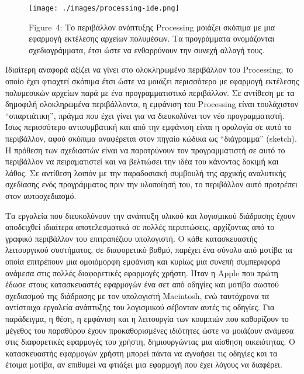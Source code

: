 \documentclass[
]{article}
\begin{document}
\leavevmode{}%
\begin{figure}
\hypertarget{fig:processing-ide}{%
\centering
\texttt{[image: ./images/processing-ide.png]}
\caption{Figure~4: Το περιβάλλον ανάπτυξης Processing μοιάζει σκόπιμα με
μια εφαρμογή εκτέλεσης αρχείων πολυμέσων. Τα προγράμματα ονομάζονται
σχεδιαγράμματα, έτσι ώστε να ενθαρρύνουν την συνεχή αλλαγή
τους.}\label{fig:processing-ide}
}
\end{figure}

Ιδιαίτερη αναφορά αξίζει να γίνει στο ολοκληρωμένο περιβάλλον του
Processing, το οποίο έχει φτιαχτεί σκόπιμα έτσι ώστε να μοιάζει
περισσότερο με εφαρμογή εκτέλεσης πολυμεσικών αρχείων παρά με ένα
προγραμματιστικό περιβάλλον. Σε αντίθεση με τα δημοφιλή ολοκληρωμένα
περιβάλλοντα, η εμφάνιση του Processing είναι τουλάχιστον
``σπαρτιάτικη'', πράγμα που έχει γίνει για να διευκολύνει τον νέο
προγραμματιστή. Ίσως περισσότερο αντισυμβατική και από την εμφάνιση
είναι η ορολογία σε αυτό το περιβάλλον, αφού σκόπιμα αναφέρεται στον
πηγαίο κώδικα ως ``διάγραμμα'' (sketch). Η πρόθεση των σχεδιαστών είναι
να παροτρύνουν τον προγραμματιστή σε αυτό το περιβάλλον να πειραματιστεί
και να βελτιώσει την ιδέα του κάνοντας δοκιμή και λάθος. Σε αντίθεση
λοιπόν με την παραδοσιακή συμβουλή της αρχικής αναλυτικής σχεδίασης ενός
προγράμματος πριν την υλοποίησή του, το περιβάλλον αυτό προτρέπει στον
αυτοσχεδιασμό.

Τα εργαλεία που διευκολύνουν την ανάπτυξη υλικού και λογισμικού
διάδρασης έχουν αποδειχθεί ιδιαίτερα αποτελεσματικά σε πολλές
περιπτώσεις, αρχίζοντας από το γραφικό περιβάλλον του επιτραπέζιου
υπολογιστή. Ο κάθε κατασκευαστής λειτουργικού συστήματος, σε διαφορετικό
βαθμό, παρέχει ένα σύνολο από μοτίβα τα οποία επιτρέπουν μια ομοιόμορφη
εμφάνιση και κυρίως μια συνεπή συμπεριφορά ανάμεσα στις πολλές
διαφορετικές εφαρμογές χρήστη. Ήταν η Apple που πρώτη έδωσε στους
κατασκευαστές εφαρμογών ένα σετ από οδηγίες και μοτίβα σωστού σχεδιασμού
της διάδρασης με τον υπολογιστή Macintosh, ενώ ταυτόχρονα τα αντίστοιχα
εργαλεία ανάπτυξης του λογισμικού σέβονταν αυτές τις οδηγίες. Για
παράδειγμα, η θέση, η εμφάνιση και η λειτουργία των κουμπιών που
καθορίζουν το μέγεθος του παραθύρου έχουν προκαθορισμένες ιδιότητες ώστε
να μοιάζουν ανάμεσα στις διαφορετικές εφαρμογές του χρήστη,
δημιουργώντας μια αίσθηση οικειότητας. Ο κατασκευαστής εφαρμογών χρήστη
μπορεί πάντα να αγνοήσει τις οδηγίες και τα έτοιμα μοτίβα, αν επιθυμεί
να φτιάξει μια εφαρμογή που έχει λόγους να διαφέρει.
\end{document}
